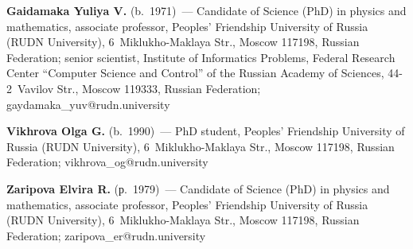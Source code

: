 \vspace*{3pt}

\noindent
\textbf{Gaidamaka Yuliya V.} (b.\ 1971)~--- Candidate of Science (PhD) in physics and 
mathematics, associate professor, Peoples' Friendship University of Russia (RUDN University), 
6~Miklukho-Maklaya Str., Moscow 117198, Russian Federation; senior scientist, Institute of 
Informatics Problems, Federal Research Center ``Computer Science and Control'' of the Russian 
Academy of Sciences, 44-2~Vavilov Str., Moscow 119333, Russian Federation; 
\mbox{gaydamaka\_yuv@rudn.university}

\vspace*{3pt}

\noindent
\textbf{Vikhrova Olga G.} (b.\ 1990)~--- PhD student, Peoples' Friendship University of Russia 
(RUDN University), 6~Miklukho-Maklaya Str., Moscow 117198, Russian Federation; 
\mbox{vikhrova\_og@rudn.university}

\vspace*{3pt}

\noindent
\textbf{Zaripova Elvira R.} (р.\ 1979)~--- Candidate of Science (PhD) in physics and 
mathematics, associate professor, Peoples' Friendship University of Russia (RUDN University), 
6~Miklukho-Maklaya Str., Moscow 117198, Russian Federation; 
\mbox{zaripova\_er@rudn.university}

\label{end\stat}


\renewcommand{\bibname}{\protect\rm Литература} 